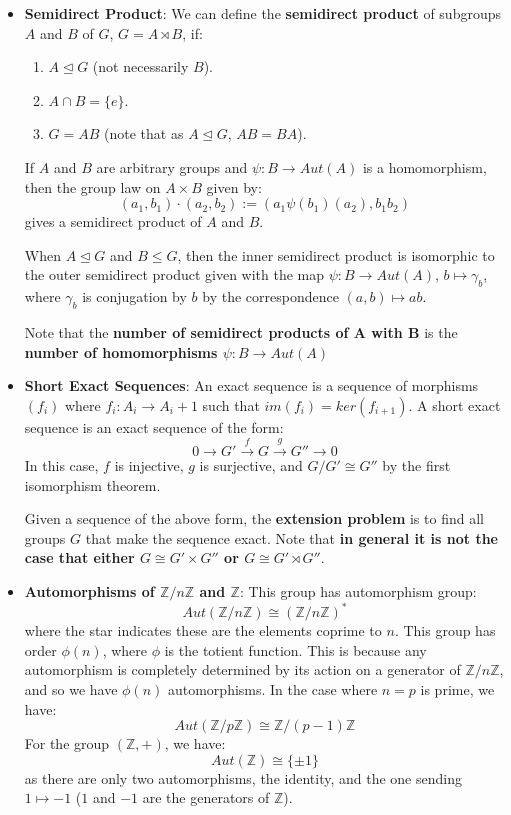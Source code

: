\documentclass[11pt, oneside]{amsart}   	%
\theoremstyle{definition}
\begin{document}
\begin{itemize}
	\item \textbf{Semidirect Product}: We can define the \textbf{semidirect product} of subgroups $A$ and $B$ of $G$, $G = A\rtimes B$, if:
	
	\begin{enumerate}
	
		\item $A\trianglelefteq G$ (not necessarily $B$).
		
		\item $A\cap B = \{e\}$.
		
		\item $G = AB$ (note that as $A\trianglelefteq G$, $AB = BA$).
	
	\end{enumerate}
	
	If $A$ and $B$ are arbitrary groups and $\psi : B\rightarrow Aut(A)$ is a homomorphism, then the group law on $A\times B$ given by:
	$$
		(a_1, b_1)\cdot (a_2, b_2) := (a_1\psi(b_1)(a_2), b_1b_2)
	$$
	gives a semidirect product of $A$ and $B$. 
	
	When $A\trianglelefteq G$ and $B\leq G$, then the inner semidirect product is isomorphic to the outer semidirect product given with the 
	map $\psi: B\rightarrow Aut(A)$, $b\mapsto \gamma_b$, where $\gamma_b$ is conjugation by $b$ by the correspondence $(a, b)\mapsto 
	ab$.
	
	Note that the \textbf{number of semidirect products of A with B} is the \textbf{number of homomorphisms $\psi : B\rightarrow Aut(A)$}
	
	\item \textbf{Short Exact Sequences}: An exact sequence is a sequence of morphisms $(f_i)$ where $f_i : A_i\rightarrow A_i + 1$ such that 
	$im(f_i) = ker(f_{i + 1})$. A short exact sequence is an exact sequence of the form:
	$$
		0\longrightarrow G' \overset{f}{\longrightarrow} G\overset{g}{\longrightarrow} G''\longrightarrow 0
	$$
	In this case, $f$ is injective, $g$ is surjective, and $G/G'\cong G''$ by the first isomorphism theorem.
	
	Given a sequence of the above form, the \textbf{extension problem} is to find all groups $G$ that make the sequence exact. Note that 
	\textbf{in general it is not the case that either $G\cong G'\times G''$ or $G\cong G'\rtimes G''$}.
	
	\item \textbf{Automorphisms of $\mathbb Z/n\mathbb Z$ and $\mathbb Z$}: This group has automorphism group:
	$$
		Aut(\mathbb Z/n\mathbb Z) \cong (\mathbb Z/n\mathbb Z)^*
	$$
	where the star indicates these are the elements coprime to $n$. This group has order $\phi(n)$, where $\phi$ is the totient function. This is 
	because any automorphism is completely determined by its action on a generator of $\mathbb Z/n\mathbb Z$, and so we have $\phi(n)$ 
	automorphisms. In the case where $n = p$ is prime, we have:
	$$
		Aut(\mathbb Z/p\mathbb Z) \cong \mathbb Z / (p - 1)\mathbb Z
	$$
	For the group $(\mathbb Z, +)$, we have:
	$$
		Aut(\mathbb Z) \cong \{\pm 1\}
	$$
	as there are only two automorphisms, the identity, and the one sending $1\mapsto -1$ ($1$ and $-1$ are the generators of $\mathbb Z$).
	

\end{itemize}
\end{document}
